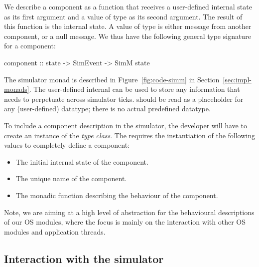 We describe a component as a function that receives a user-defined internal state as its first argument and a value of type  as its second argument.
The result of this function is the internal state.
A value of type  is either message from another component, or a null message.
We thus have the following general type signature for a component:
\begin{code}
component :: state -> SimEvent -> SimM state
\end{code}

The simulator monad  is described in Figure~\ref{fig:code-simm} in Section~\ref{sec:impl-monads}.
The user-defined internal  can be used to store any information that needs to perpetuate across simulator ticks.
 should be read as a placeholder for any (user-defined) datatype; there is no actual predefined  datatype.

To include a component description in the simulator, the developer will have to create an instance of the  \emph{type class}.
The  requires the instantiation of the following values to completely define a component:

\begin{itemize}
  \item The initial internal state of the component.
  \item The unique name of the component.
  \item The monadic function describing the behaviour of the component.
\end{itemize}

Note, we are aiming at a high level of abstraction for the behavioural descriptions of our OS modules, where the focus is mainly on the interaction with other OS modules and application threads.


\subsection{Interaction with the simulator}

%
%

